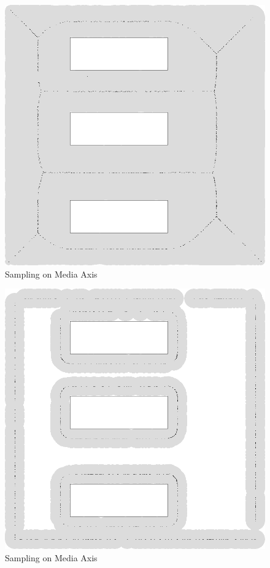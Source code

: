\documentclass[12pt]{article}
\begin{document}
  \begin{figure}[p]
  \centering
  \includegraphics[scale=0.5]{MediaAxis_Cover.PNG}  
  \caption{Sampling on Media Axis}   
  \label{fig:MA} 
  \end{figure}
  
  \begin{figure}[p]
  \centering
  \includegraphics[scale=0.5]{MediaAxis_cost_30.PNG}  
  \caption{Sampling on Media Axis}   
  \label{fig:ISO} 
  \end{figure}
        
\end{document}
